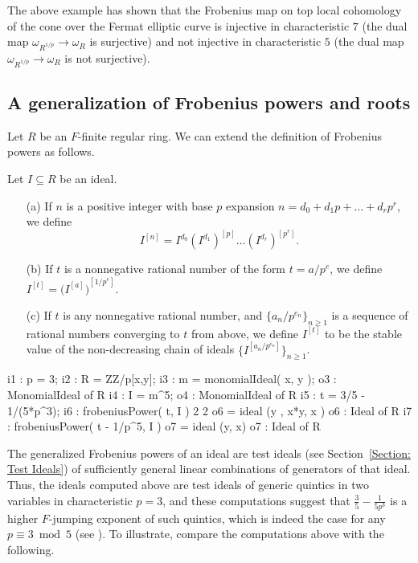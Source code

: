 \documentclass{amsart}
\renewcommand{\geq}{\geqslant}
\begin{document}
The above example has shown that the Frobenius map on top local cohomology of the cone over the Fermat elliptic curve is injective in characteristic $7$ (the dual map $\omega_{R^{1/p}} \to \omega_R$ is surjective) and not injective in characteristic $5$ (the dual map $\omega_{R^{1/p}} \to \omega_R$ is not surjective).

\subsection{A generalization of Frobenius powers and roots}

Let $R$ be an $F$-finite regular ring.
We can extend the definition of Frobenius powers as follows.

\begin{definition}
Let  $I\subseteq R$ be an ideal.
\begin{enumerate}
 \item[(a)] If $n$ is a positive integer with base $p$ expansion  $n=d_0 + d_1 p +  \dots + d_r p^r$, we define
\[ I^{[n]}=I^{d_0} (I^{d_1})^{[p]} \dots  (I^{d_r})^{[p^r]}.\]
 \item[(b)] If $t$ is a nonnegative rational number of the form $t = a/p^e$, we define  $I^{[t]} = {\big(I^{[a]}\big)}^{[1/p^e]}.$
 \item[(c)] If $t$ is any nonnegative rational number, and $\{a_n/p^{e_n}\}_{n\geq 1}$ is a sequence of rational numbers converging to $t$ from above, we define $I^{[t]}$
 to be the stable value of the non-decreasing chain of ideals $\{I^{[a_n/p^{e_n}]}\}_{n\geq 1}$.
\end{enumerate}
\end{definition}

\medskip
{\small
\begin{MyVerbatim}
i1 : p = 3;
i2 : R = ZZ/p[x,y];
i3 : m = monomialIdeal( x, y );
o3 : MonomialIdeal of R
i4 : I = m^5;
o4 : MonomialIdeal of R
i5 : t = 3/5 - 1/(5*p^3);
i6 : frobeniusPower( t, I )
             2        2
o6 = ideal (y , x*y, x )
o6 : Ideal of R
i7 : frobeniusPower( t - 1/p^5, I )
o7 = ideal (y, x)
o7 : Ideal of R   
\end{MyVerbatim}
}
\medskip

The generalized Frobenius powers of an ideal are test ideals (see Section~\ref{Section: Test Ideals}) of sufficiently general linear combinations of generators of that ideal.
Thus, the ideals computed above are test ideals of generic quintics in two variables in characteristic $p=3$, and these computations suggest that $\frac35-\frac1{5p^3}$ is a higher $F$-jumping exponent of such quintics, which is indeed the case for any $p\equiv 3 \bmod 5$ (see \cite{hernandez+etal.frobenius_examples}).
To illustrate, compare the computations above with the following.
\end{document}

